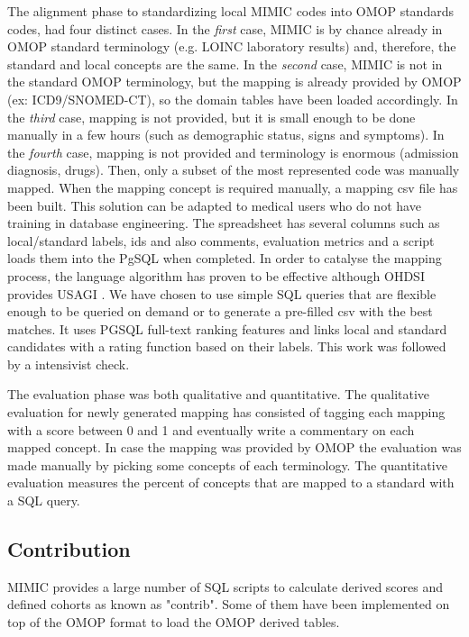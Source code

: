 The alignment phase to standardizing local MIMIC codes into OMOP standards
codes, had four distinct cases. In the \emph{first} case, MIMIC is by chance
already in OMOP standard terminology (e.g. LOINC laboratory results) and,
therefore, the standard and local concepts are the same. In the \emph{second}
case, MIMIC is not in the standard OMOP terminology, but the mapping is already
provided by OMOP (ex: ICD9/SNOMED-CT), so the domain tables have been loaded
accordingly.  In the \emph{third} case, mapping is not provided, but it is
small enough to be done manually in a few hours (such as demographic status,
signs and symptoms). In the \emph{fourth} case, mapping is not provided and
terminology is enormous (admission diagnosis, drugs). Then, only a subset of
the most represented code was manually mapped.
When the mapping concept is required manually, a mapping csv file has been
built.  This solution can be adapted to medical users who do not have training
in database engineering. The spreadsheet has several columns such as
local/standard labels, ids and also comments, evaluation metrics and a script
loads them into the PgSQL when completed. In order to catalyse the mapping
process, the language algorithm has proven to be effective
\cite{schema-matching} although OHDSI provides USAGI \cite{usagi}. We have
chosen to use simple SQL queries that are flexible enough to be queried on
demand or to generate a pre-filled csv with the best matches. It uses PGSQL
full-text ranking features  and links local and standard candidates with a
rating function based on their labels. This work was followed by a intensivist
check.

The evaluation phase was both qualitative and quantitative.
The qualitative evaluation for newly generated mapping has consisted of tagging
each mapping with a score between 0 and 1 and eventually write a commentary on
each mapped concept. In case the mapping was provided by OMOP the evaluation
was made manually by picking some concepts of each terminology.
The quantitative evaluation measures the percent of concepts that are mapped to
a standard with a SQL query.

%
%
\subsection{Contribution}

MIMIC provides a large number of SQL scripts to calculate derived scores and
defined cohorts as known as "contrib". Some of them have been implemented on
top of the OMOP format to load the OMOP derived tables. 

